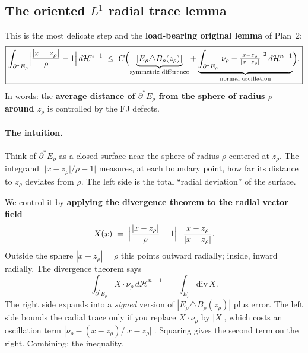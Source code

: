 \documentclass[11pt,a4paper]{article}
\newcommand{\Erho}{E_\rho}
\begin{document}
\subsection*{The oriented $L^1$ radial trace lemma}

This is the most delicate step and the \textbf{load-bearing original lemma} of Plan~2:
\[
\boxed{
\int_{\partial^* \Erho} \Bigl|\frac{|x - z_\rho|}{\rho} - 1\Bigr|\, d\mathcal{H}^{n-1}
\;\le\; C\Bigl(\underbrace{|\Erho \triangle B_\rho(z_\rho)|}_{\text{symmetric difference}} + \underbrace{\int_{\partial^* \Erho} \bigl|\nu_\rho - \tfrac{x-z_\rho}{|x-z_\rho|}\bigr|^2\, d\mathcal{H}^{n-1}}_{\text{normal oscillation}}\Bigr).
}
\]
In words: the \textbf{average distance of $\partial^* \Erho$ from the sphere of radius $\rho$ around $z_\rho$} is controlled by the FJ defects.

\paragraph{The intuition.}
Think of $\partial^* \Erho$ as a closed surface near the sphere of radius $\rho$ centered at $z_\rho$. The integrand $||x-z_\rho|/\rho - 1|$ measures, at each boundary point, how far its distance to $z_\rho$ deviates from $\rho$. The left side is the total ``radial deviation'' of the surface.

We control it by \textbf{applying the divergence theorem to the radial vector field}
\[
X(x) \;=\; \Bigl|\frac{|x - z_\rho|}{\rho} - 1\Bigr| \cdot \frac{x - z_\rho}{|x - z_\rho|}.
\]
Outside the sphere $|x-z_\rho|=\rho$ this points outward radially; inside, inward radially. The divergence theorem says
\[
\int_{\partial^* \Erho} X \cdot \nu_\rho \, d\mathcal{H}^{n-1} \;=\; \int_{\Erho} \mathrm{div}\, X.
\]
The right side expands into a \emph{signed} version of $|\Erho \triangle B_\rho(z_\rho)|$ plus error. The left side bounds the radial trace only if you replace $X \cdot \nu_\rho$ by $|X|$, which costs an oscillation term $|\nu_\rho - (x-z_\rho)/|x-z_\rho||$. Squaring gives the second term on the right. Combining: the inequality.
\end{document}
